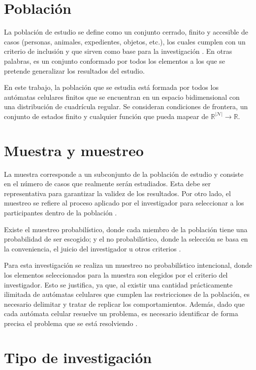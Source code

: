 \section{Población}

La población de estudio se define como un conjunto cerrado, finito y accesible de casos (personas, animales, expedientes, objetos, etc.), los cuales cumplen con un criterio de inclusión y que sirven como base para la investigación \cite{arias2016_poblacion}. En otras palabras, es un conjunto conformado por todos los elementos a los que se pretende generalizar los resultados del estudio.

En este trabajo, la población que se estudia está formada por todos los autómatas celulares finitos que se encuentran en un espacio bidimensional con una distribución de cuadrícula regular. Se consideran condiciones de frontera, un conjunto de estados finito y cualquier función que pueda mapear de $\mathbb{R}^{|\mathcal{N}|} \to \mathbb{R}$.

\section{Muestra y muestreo}

La muestra corresponde a un subconjunto de la población de estudio y consiste en el número de casos que realmente serán estudiados. Esta debe ser representativa para garantizar la validez de los resultados. Por otro lado, el muestreo se refiere al proceso aplicado por el investigador para seleccionar a los participantes dentro de la población \cite{diaz2017_muestra}.

Existe el muestreo probabilístico, donde cada miembro de la población tiene una probabilidad de ser escogido; y el no probabilístico, donde la selección se basa en la conveniencia, el juicio del investigador u otros criterios \cite{diaz2017_muestra}. 

Para esta investigación se realiza un muestreo no probabilístico intencional, donde los elementos seleccionados para la muestra son elegidos por el criterio del investigador. Esto se justifica, ya que, al existir una cantidad prácticamente ilimitada de autómatas celulares que cumplen las restricciones de la población, es necesario delimitar y tratar de replicar los comportamientos. Además, dado que cada autómata celular resuelve un problema, es necesario identificar de forma precisa el problema que se está resolviendo \cite{computationalBiology2016}.

\section{Tipo de investigación}

